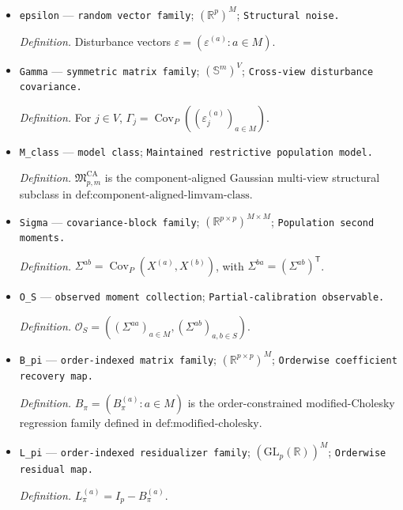\documentclass{article}
\begin{document}
\begin{itemize}
  \par\smallskip\noindent\emph{Definition.} Primitive structural coefficients \(B^0=(B^{0,(a)}:a\in M)\).
  \item \texttt{epsilon} --- \texttt{random vector family}; \((\mathbb R^p)^M\); \texttt{Structural noise.}
  \par\smallskip\noindent\emph{Definition.} Disturbance vectors \(\varepsilon=(\varepsilon^{(a)}:a\in M)\).
  \item \texttt{Gamma} --- \texttt{symmetric matrix family}; \((\mathbb S^{m})^V\); \texttt{Cross-\allowbreak{}view disturbance covariance.}
  \par\smallskip\noindent\emph{Definition.} For \(j\in V\), \(\Gamma_j=\operatorname{Cov}_P((\varepsilon_j^{(a)})_{a\in M})\).
  \item \texttt{M\_\allowbreak{}class} --- \texttt{model class}; \texttt{Maintained restrictive population model.}
  \par\smallskip\noindent\emph{Definition.} \(\mathfrak M_{p,m}^{\mathrm{CA}}\) is the component-aligned Gaussian multi-view structural subclass in \(\text{def:component-aligned-limvam-class}\).
  \item \texttt{Sigma} --- \texttt{covariance-\allowbreak{}block family}; \((\mathbb R^{p\times p})^{M\times M}\); \texttt{Population second moments.}
  \par\smallskip\noindent\emph{Definition.} \(\Sigma^{ab}=\operatorname{Cov}_P(X^{(a)},X^{(b)})\), with \(\Sigma^{ba}=(\Sigma^{ab})^{\mathsf T}\).
  \item \texttt{O\_\allowbreak{}S} --- \texttt{observed moment collection}; \texttt{Partial-\allowbreak{}calibration observable.}
  \par\smallskip\noindent\emph{Definition.} \(\mathcal O_S=((\Sigma^{aa})_{a\in M},(\Sigma^{ab})_{a,b\in S})\).
  \item \texttt{B\_\allowbreak{}pi} --- \texttt{order-\allowbreak{}indexed matrix family}; \((\mathbb R^{p\times p})^M\); \texttt{Orderwise coefficient recovery map.}
  \par\smallskip\noindent\emph{Definition.} \(B_\pi=(B_\pi^{(a)}:a\in M)\) is the order-constrained modified-Cholesky regression family defined in \(\text{def:modified-cholesky}\).
  \item \texttt{L\_\allowbreak{}pi} --- \texttt{order-\allowbreak{}indexed residualizer family}; \((\mathrm{GL}_p(\mathbb R))^M\); \texttt{Orderwise residual map.}
  \par\smallskip\noindent\emph{Definition.} \(L_\pi^{(a)}=I_p-B_\pi^{(a)}\).

\end{itemize}
\end{document}
